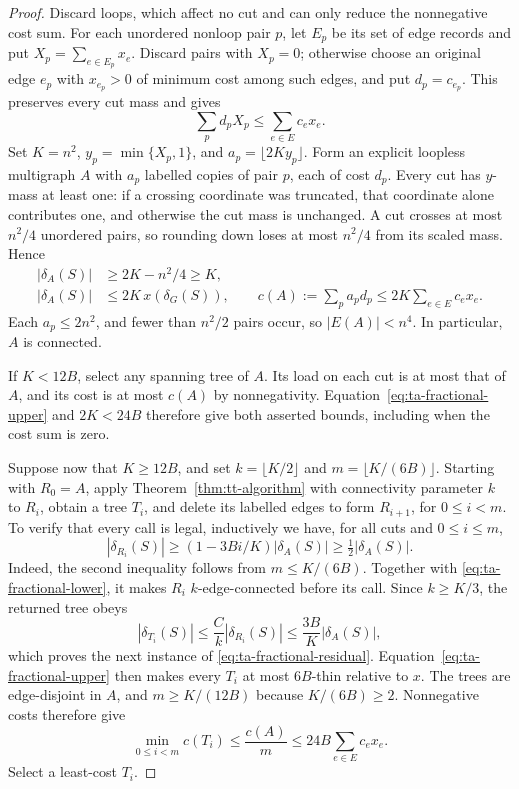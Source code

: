 \begin{proof}
Discard loops, which affect no cut and can only reduce the nonnegative
cost sum. For each unordered nonloop pair $p$, let $E_p$ be its set of
edge records and put $X_p=\sum_{e\in E_p}x_e$. Discard pairs with $X_p=0$;
otherwise choose an original edge $e_p$ with $x_{e_p}>0$ of minimum
cost among such edges, and put $d_p=c_{e_p}$. This preserves every
cut mass and gives
\[
 \sum_p d_pX_p\le\sum_{e\in E}c_ex_e.
\]
Set $K=n^2$, $y_p=\min\{X_p,1\}$, and
$a_p=\lfloor2K y_p\rfloor$. Form an explicit loopless multigraph $A$
with $a_p$ labelled copies of pair $p$, each of cost $d_p$.
Every cut has $y$-mass at least one: if a crossing coordinate was
truncated, that coordinate alone contributes one, and otherwise the
cut mass is unchanged. A cut crosses at most $n^2/4$ unordered pairs,
so rounding down loses at most $n^2/4$ from its scaled mass. Hence
\begin{align}
 |\delta_A(S)|&\ge2K-n^2/4\ge K,
       \label{eq:ta-fractional-lower}\\
 |\delta_A(S)|&\le2K\,x(\delta_G(S)),
       \qquad
 c(A):=\sum_p a_pd_p\le2K\sum_{e\in E}c_ex_e.
       \label{eq:ta-fractional-upper}
\end{align}
Each $a_p\le2n^2$, and fewer than $n^2/2$ pairs occur, so
$|E(A)|<n^4$. In particular, $A$ is connected.

If $K<12B$, select any spanning tree of $A$. Its load on each cut is
at most that of $A$, and its cost is at most $c(A)$ by nonnegativity.
Equation~\eqref{eq:ta-fractional-upper} and $2K<24B$ therefore give
both asserted bounds, including when the cost sum is zero.

Suppose now that $K\ge12B$, and set
$k=\lfloor K/2\rfloor$ and $m=\lfloor K/(6B)\rfloor$.
Starting with $R_0=A$, apply Theorem~\ref{thm:tt-algorithm} with
connectivity parameter $k$ to $R_i$, obtain a tree $T_i$, and delete
its labelled edges to form $R_{i+1}$, for $0\le i<m$.
To verify that every call is legal, inductively we have, for all cuts
and $0\le i\le m$,
\begin{equation}
 |\delta_{R_i}(S)|\ge
       (1-3Bi/K)|\delta_A(S)|\ge\tfrac12|\delta_A(S)|.
 \label{eq:ta-fractional-residual}
\end{equation}
Indeed, the second inequality follows from $m\le K/(6B)$.
Together with \eqref{eq:ta-fractional-lower}, it makes $R_i$
$k$-edge-connected before its call. Since $k\ge K/3$, the returned tree
obeys
\[
 |\delta_{T_i}(S)|\le\frac Ck|\delta_{R_i}(S)|
       \le\frac{3B}{K}|\delta_A(S)|,
\]
which proves the next instance of
\eqref{eq:ta-fractional-residual}. Equation~\eqref{eq:ta-fractional-upper}
then makes every $T_i$ at most $6B$-thin relative to $x$.
The trees are edge-disjoint in $A$, and
$m\ge K/(12B)$ because $K/(6B)\ge2$. Nonnegative costs therefore give
\[
 \min_{0\le i<m}c(T_i)
       \le\frac{c(A)}m
       \le24B\sum_{e\in E}c_ex_e.
\]
Select a least-cost $T_i$.


\end{proof}
